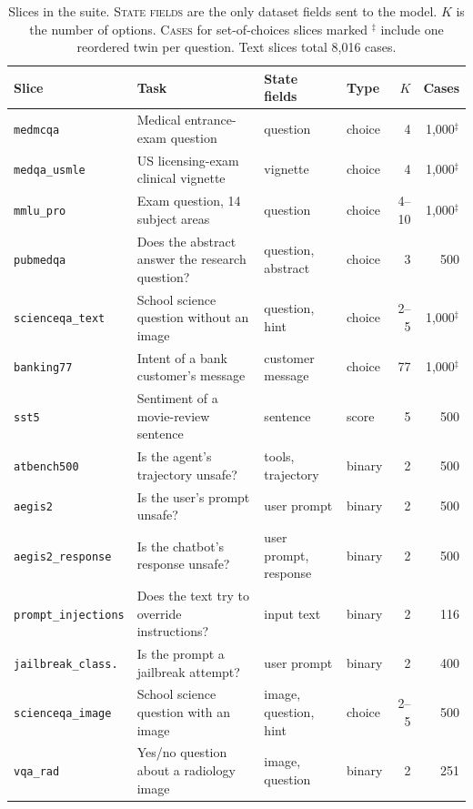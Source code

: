 \begin{table}[t]
\centering
\caption{Slices in the suite. \textsc{State fields} are the only dataset fields
sent to the model. $K$ is the number of options. \textsc{Cases} for
set-of-choices slices marked $^{\ddagger}$ include one reordered twin per
question. Text slices total 8{,}016 cases.}
\label{tab:datasets}
\small
\begin{tabular}{@{}l p{4.9cm} p{3.2cm} l r r@{}}
\toprule
Slice & Task & State fields & Type & $K$ & Cases \\
\midrule
\texttt{medmcqa}           & Medical entrance-exam question & question & choice & 4 & 1{,}000$^{\ddagger}$ \\
\texttt{medqa\_usmle}      & US licensing-exam clinical vignette & vignette & choice & 4 & 1{,}000$^{\ddagger}$ \\
\texttt{mmlu\_pro}         & Exam question, 14 subject areas & question & choice & 4--10 & 1{,}000$^{\ddagger}$ \\
\texttt{pubmedqa}          & Does the abstract answer the research question? & question, abstract & choice & 3 & 500 \\
\texttt{scienceqa\_text}   & School science question without an image & question, hint & choice & 2--5 & 1{,}000$^{\ddagger}$ \\
\texttt{banking77}         & Intent of a bank customer's message & customer message & choice & 77 & 1{,}000$^{\ddagger}$ \\
\texttt{sst5}              & Sentiment of a movie-review sentence & sentence & score & 5 & 500 \\
\texttt{atbench500}        & Is the agent's trajectory unsafe? & tools, trajectory & binary & 2 & 500 \\
\texttt{aegis2}            & Is the user's prompt unsafe? & user prompt & binary & 2 & 500 \\
\texttt{aegis2\_response}  & Is the chatbot's response unsafe? & user prompt, response & binary & 2 & 500 \\
\texttt{prompt\_injections}& Does the text try to override instructions? & input text & binary & 2 & 116 \\
\texttt{jailbreak\_class.} & Is the prompt a jailbreak attempt? & user prompt & binary & 2 & 400 \\
\midrule
\texttt{scienceqa\_image}  & School science question with an image & image, question, hint & choice & 2--5 & 500 \\
\texttt{vqa\_rad}          & Yes/no question about a radiology image & image, question & binary & 2 & 251 \\
\bottomrule
\end{tabular}
\end{table}

